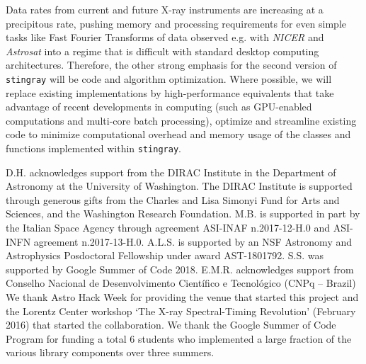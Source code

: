\documentclass[twocolumn]{aastex62}
\newcommand{\stingray}{\texttt{stingray}\xspace}
\begin{document}
Data rates from current and future X-ray instruments are increasing at a precipitous rate, pushing memory and processing requirements for even simple tasks like Fast Fourier Transforms of data observed e.g. with \textit{NICER} and \textit{Astrosat} into a regime that is difficult with standard desktop computing architectures. 
Therefore, the other strong emphasis for the second version of \stingray will be code and algorithm optimization. 
Where possible, we will replace existing implementations by high-performance equivalents that take advantage of recent developments in computing (such as GPU-enabled computations and multi-core batch processing), optimize and streamline existing code to minimize computational overhead and memory usage of the classes and functions implemented within \stingray. 


\acknowledgments

D.H. acknowledges support from the DIRAC Institute in the Department of Astronomy at the University of Washington. 
The DIRAC Institute is supported through generous gifts from the Charles and Lisa Simonyi Fund for Arts and Sciences, and the Washington Research Foundation.
M.B. is supported in part by the Italian Space Agency through agreement ASI-INAF n.2017-12-H.0 and ASI-INFN agreement n.2017-13-H.0.
A.L.S. is supported by an NSF Astronomy and Astrophysics Posdoctoral Fellowship under award AST-1801792.
S.S. was supported by Google Summer of Code 2018.
E.M.R. acknowledges support from Conselho Nacional de Desenvolvimento Cient\'ifico e Tecnol\'ogico (CNPq -- Brazil)
We thank Astro Hack Week for providing the venue that started this project and the Lorentz Center workshop `The X-ray Spectral-Timing Revolution' (February 2016) that started the collaboration. 
We thank the Google Summer of Code Program for funding a total 6 students who implemented a large fraction of the various library components over three summers.

\end{document}
